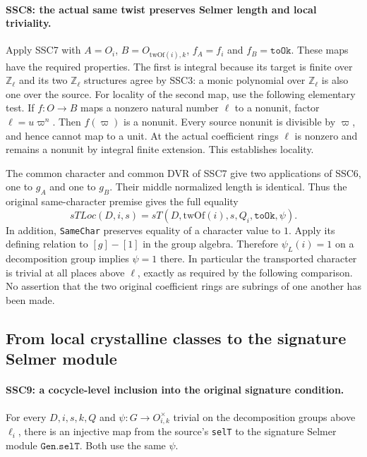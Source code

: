 \paragraph{SSC8: the actual same twist preserves Selmer length and local triviality.}
\label{claim:SSC8}
Apply SSC7 with $A=O_i$, $B=O_{\mathrm{twOf}(i),k}$,
$f_A=f_i$ and $f_B=\texttt{toOk}$. These maps have the required
properties. The first is integral because its target is finite
over $\mathbb Z_\ell$ and its two $\mathbb Z_\ell$ structures
agree by SSC3: a monic polynomial over $\mathbb Z_\ell$ is also
one over the source. For locality of the second map, use the
following elementary test. If $f:O\to B$ maps a nonzero natural
number $\ell$ to a nonunit, factor $\ell=u\varpi^n$. Then
$f(\varpi)$ is a nonunit. Every source nonunit is divisible by
$\varpi$, and hence cannot map to a unit. At the actual coefficient
rings $\ell$ is nonzero and remains a nonunit by integral finite
extension. This establishes locality.

The common character and common DVR of SSC7 give two applications
of SSC6, one to $g_A$ and one to $g_B$. Their middle normalized
length is identical. Thus the original same-character premise
gives the full equality
\[
 sTLoc(D,i,s)
      =sT(D,\mathrm{twOf}(i),s,Q_i,\texttt{toOk},\psi).        \tag{SSC.13}
\]
In addition, \texttt{SameChar} preserves equality of a character
value to $1$. Apply its defining relation to $[g]-[1]$ in the
group algebra. Therefore $\psi_L(i)=1$ on a decomposition group
implies $\psi=1$ there. In particular the transported character
is trivial at all places above $\ell$, exactly as required by the
following comparison. No assertion that the two original coefficient
rings are subrings of one another has been made.

\subsection{From local crystalline classes to the signature Selmer module}

\paragraph{SSC9: a cocycle-level inclusion into the original signature condition.}
\label{claim:SSC9}
For every $D,i,s,k,Q$ and $\psi:G\to O_{i,k}^\times$ trivial
on the decomposition groups above $\ell_i$, there is an injective
map from the source's \texttt{selT} to the signature Selmer module
$\texttt{Gen.selT}$. Both use the same $\psi$.

